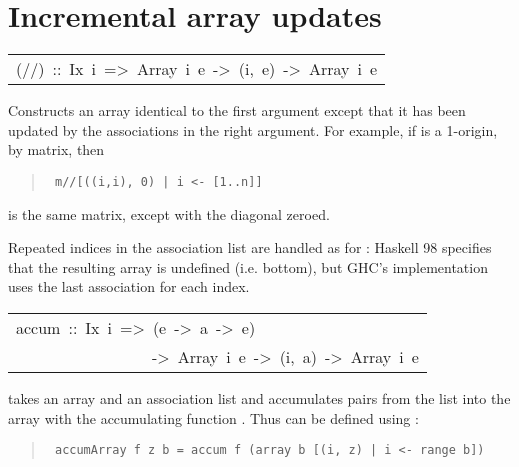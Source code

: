 \section{Incremental array updates
}
\begin{haddockdesc}
\item[\begin{tabular}{@{}l}
(//)\ ::\ Ix\ i\ =>\ Array\ i\ e\ ->\ {\char 91}(i,\ e){\char 93}\ ->\ Array\ i\ e
\end{tabular}]\haddockbegindoc
Constructs an array identical to the first argument except that it has
 been updated by the associations in the right argument.
 For example, if  is a 1-origin,  by  matrix, then
\par
\begin{quote}
{\haddockverb\begin{verbatim}
 m//[((i,i), 0) | i <- [1..n]]
\end{verbatim}}
\end{quote}
is the same matrix, except with the diagonal zeroed.
\par
Repeated indices in the association list are handled as for :
 Haskell 98 specifies that the resulting array is undefined (i.e. bottom),
 but GHC's implementation uses the last association for each index.
\par

\end{haddockdesc}
\begin{haddockdesc}
\item[\begin{tabular}{@{}l}
accum\ ::\ Ix\ i\ =>\ (e\ ->\ a\ ->\ e)\\\ \ \ \ \ \ \ \ \ \ \ \ \ \ \ \ \ ->\ Array\ i\ e\ ->\ {\char 91}(i,\ a){\char 93}\ ->\ Array\ i\ e
\end{tabular}]\haddockbegindoc
{} takes an array and an association list and accumulates
 pairs from the list into the array with the accumulating function .
 Thus  can be defined using :
\par
\begin{quote}
{\haddockverb\begin{verbatim}
 accumArray f z b = accum f (array b [(i, z) | i <- range b])
\end{verbatim}}
\end{quote}

\end{haddockdesc}
